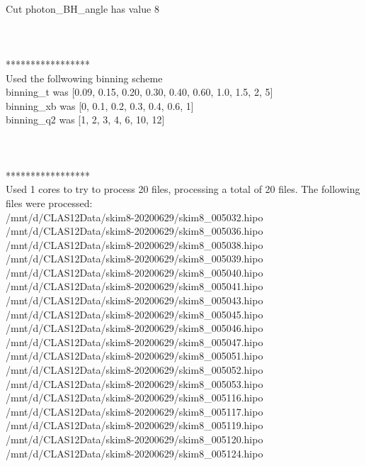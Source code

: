 \documentclass{article}
\begin{document}
\\Cut photon\_BH\_angle has value 8 
\\
\\ 
\\ 
\\ ***************** 
\\ Used the follwowing binning scheme 
\\binning\_t was [0.09, 0.15, 0.20, 0.30, 0.40, 0.60, 1.0, 1.5, 2, 5] 
\\binning\_xb was [0, 0.1, 0.2, 0.3, 0.4, 0.6, 1] 
\\binning\_q2 was [1, 2, 3, 4, 6, 10, 12] 
\\
\\ 
\\ 
\\ ***************** 
\\ Used 1 cores to try to process 20 files, processing a total of 20 files. The following files were processed: 
\\/mnt/d/CLAS12Data/skim8-20200629/skim8\_005032.hipo 
\\/mnt/d/CLAS12Data/skim8-20200629/skim8\_005036.hipo 
\\/mnt/d/CLAS12Data/skim8-20200629/skim8\_005038.hipo 
\\/mnt/d/CLAS12Data/skim8-20200629/skim8\_005039.hipo 
\\/mnt/d/CLAS12Data/skim8-20200629/skim8\_005040.hipo 
\\/mnt/d/CLAS12Data/skim8-20200629/skim8\_005041.hipo 
\\/mnt/d/CLAS12Data/skim8-20200629/skim8\_005043.hipo 
\\/mnt/d/CLAS12Data/skim8-20200629/skim8\_005045.hipo 
\\/mnt/d/CLAS12Data/skim8-20200629/skim8\_005046.hipo 
\\/mnt/d/CLAS12Data/skim8-20200629/skim8\_005047.hipo 
\\/mnt/d/CLAS12Data/skim8-20200629/skim8\_005051.hipo 
\\/mnt/d/CLAS12Data/skim8-20200629/skim8\_005052.hipo 
\\/mnt/d/CLAS12Data/skim8-20200629/skim8\_005053.hipo 
\\/mnt/d/CLAS12Data/skim8-20200629/skim8\_005116.hipo 
\\/mnt/d/CLAS12Data/skim8-20200629/skim8\_005117.hipo 
\\/mnt/d/CLAS12Data/skim8-20200629/skim8\_005119.hipo 
\\/mnt/d/CLAS12Data/skim8-20200629/skim8\_005120.hipo 
\\/mnt/d/CLAS12Data/skim8-20200629/skim8\_005124.hipo 
\end{document}
